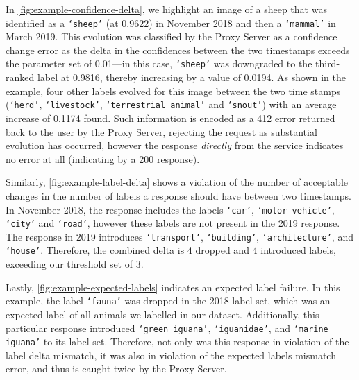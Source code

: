 In \cref{fig:example-confidence-delta}, we highlight an image of a sheep that was identified as a \texttt{`sheep'} (at 0.9622) in November 2018 and then a \texttt{`mammal'} in March 2019. This evolution was classified by the Proxy Server as a confidence change error as the delta in the confidences between the two timestamps exceeds the parameter set of 0.01---in this case, \texttt{`sheep'} was downgraded to the third-ranked label at 0.9816, thereby increasing by a value of 0.0194. As shown in the example, four other labels evolved for this image between the two time stamps (\texttt{`herd'}, \texttt{`livestock'}, \texttt{`terrestrial animal'} and \texttt{`snout'}) with an average increase of 0.1174 found. Such information is encoded as a 412  error returned back to the user by the Proxy Server, rejecting the request as substantial evolution has occurred, however the response \textit{directly} from the service indicates no error at all (indicating by a 200  response).

Similarly, \cref{fig:example-label-delta} shows a violation of the number of acceptable changes in the number of labels a response should have between two timestamps. In November 2018, the response includes the labels \texttt{`car'}, \texttt{`motor vehicle'}, \texttt{`city'} and \texttt{`road'}, however these labels are not present in the 2019 response. The response in 2019 introduces \texttt{`transport'}, \texttt{`building'}, \texttt{`architecture'}, and \texttt{`house'}. Therefore, the combined delta is 4 dropped and 4 introduced labels, exceeding our threshold set of 3.

Lastly, \cref{fig:example-expected-labels} indicates an expected label failure. In this example, the label \texttt{`fauna'} was dropped in the 2018 label set, which was an expected label of all animals we labelled in our dataset. Additionally, this particular response introduced  \texttt{`green iguana'}, \texttt{`iguanidae'}, and \texttt{`marine iguana'} to its label set. Therefore, not only was this response in violation of the label delta mismatch, it was also in violation of the expected labels mismatch error, and thus is caught twice by the Proxy Server.



